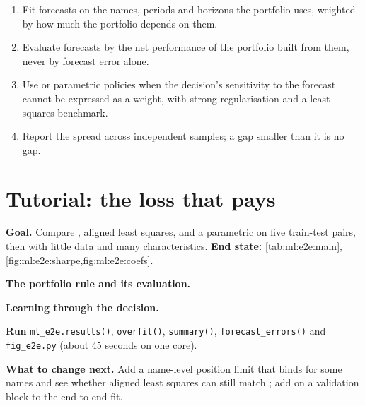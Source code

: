 \begin{method}\label{met:ml:e2e:method}
\begin{enumerate}
\item Fit forecasts on the names, periods and horizons the portfolio uses, weighted by how much the portfolio depends on them.
\item Evaluate forecasts by the net performance of the portfolio built from them, never by forecast error alone.
\item Use  or parametric policies when the decision's sensitivity to the forecast cannot be expressed
as a weight, with strong regularisation and a least-squares benchmark.
\item Report the spread across independent samples; a gap smaller than it is no gap.
\end{enumerate}
\end{method}

\section{Tutorial: the loss that pays}\label{tut:ml:from-prediction-to-portfolio:tut}

\begin{tutorial}
\textbf{Goal.} Compare , aligned least squares,  and a parametric  on five
train-test pairs, then with little data and many characteristics. \textbf{End state:} \cref{tab:ml:e2e:main},
\cref{fig:ml:e2e:sharpe,fig:ml:e2e:coefs}.
\begin{tutsteps}
\item \textbf{The portfolio rule and its evaluation.}
\label{lst:ml:e2e:run}
\item \textbf{Learning through the decision.}
\label{lst:ml:e2e:train}
\item \textbf{Run} \texttt{ml\_e2e.results()}, \texttt{overfit()}, \texttt{summary()}, \texttt{forecast\_errors()} and
\texttt{fig\_e2e.py} (about 45 seconds on one core).
\end{tutsteps}
\textbf{What to change next.} Add a name-level position limit that binds for some names and see whether aligned least squares
can still match ; add  on a validation block to the end-to-end fit.
\end{tutorial}

